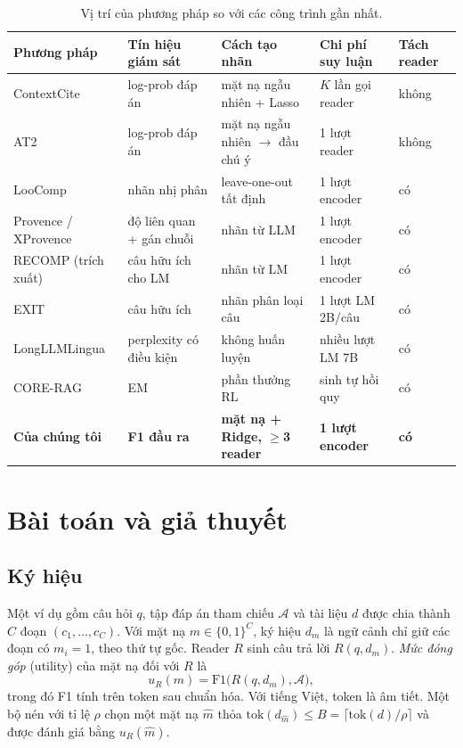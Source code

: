 \documentclass[11pt]{article}
\begin{document}
\begin{table}[t]
\centering
\footnotesize
\setlength{\tabcolsep}{4pt}
\begin{tabular}{lllll}
\toprule
\textbf{Phương pháp} & \textbf{Tín hiệu giám sát} & \textbf{Cách tạo nhãn} & \textbf{Chi phí suy luận} & \textbf{Tách reader} \\
\midrule
ContextCite & log-prob đáp án & mặt nạ ngẫu nhiên + Lasso & $K$ lần gọi reader & không \\
AT2 & log-prob đáp án & mặt nạ ngẫu nhiên $\to$ đầu chú ý & 1 lượt reader & không \\
LooComp & nhãn nhị phân & leave-one-out tất định & 1 lượt encoder & có \\
Provence / XProvence & độ liên quan + gán chuỗi & nhãn từ LLM & 1 lượt encoder & có \\
RECOMP (trích xuất) & câu hữu ích cho LM & nhãn từ LM & 1 lượt encoder & có \\
EXIT & câu hữu ích & nhãn phân loại câu & 1 lượt LM 2B/câu & có \\
LongLLMLingua & perplexity có điều kiện & không huấn luyện & nhiều lượt LM 7B & có \\
CORE-RAG & EM & phần thưởng RL & sinh tự hồi quy & có \\
\midrule
\textbf{Của chúng tôi} & \textbf{F1 đầu ra} & \textbf{mặt nạ + Ridge, $\geq$3 reader} & \textbf{1 lượt encoder} & \textbf{có} \\
\bottomrule
\end{tabular}
\caption{Vị trí của phương pháp so với các công trình gần nhất.}
\label{tab:positioning}
\end{table}

\section{Bài toán và giả thuyết}
\label{sec:hypotheses}

\subsection{Ký hiệu}

Một ví dụ gồm câu hỏi $q$, tập đáp án tham chiếu $\mathcal{A}$ và tài liệu $d$
được chia thành $C$ đoạn $(c_1,\dots,c_C)$. Với mặt nạ $m\in\{0,1\}^C$, ký hiệu
$d_m$ là ngữ cảnh chỉ giữ các đoạn có $m_i{=}1$, theo thứ tự gốc. Reader $R$ sinh câu trả
lời $R(q,d_m)$. \emph{Mức đóng góp} (utility) của mặt nạ đối với $R$ là
\begin{equation}
  u_R(m) = \mathrm{F1}\big(R(q,d_m),\mathcal{A}\big),
  \label{eq:utility}
\end{equation}
trong đó F1 tính trên token sau chuẩn hóa. Với tiếng Việt, token là âm tiết. Một
bộ nén với tỉ lệ $\rho$ chọn một mặt nạ $\hat m$ thỏa
$\mathrm{tok}(d_{\hat m})\le B=\lceil \mathrm{tok}(d)/\rho\rceil$ và được đánh giá
bằng $u_R(\hat m)$.
\end{document}
